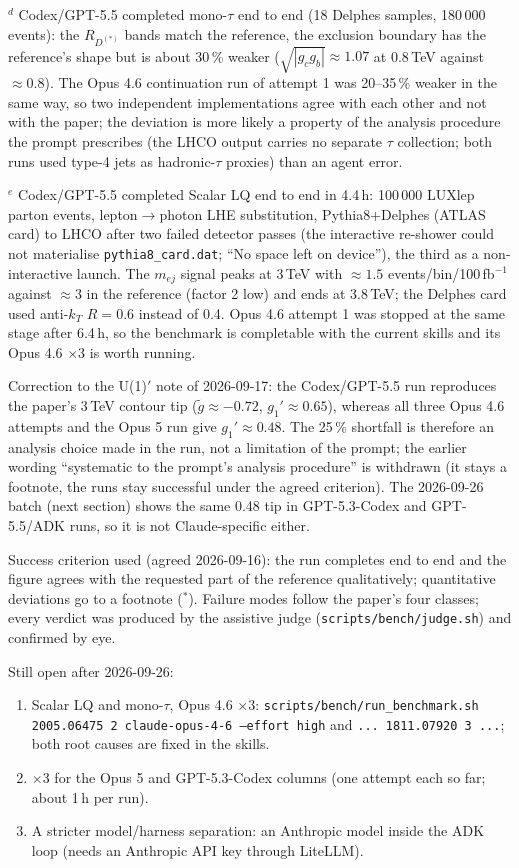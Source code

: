 \documentclass[11pt]{article}
\begin{document}
\noindent$^{d}$ Codex/GPT-5.5 completed mono-$\tau$ end to end (18 Delphes samples, 180\,000 events): the $R_{D^{(*)}}$ bands
match the reference, the exclusion boundary has the reference's shape but is about 30\,\% weaker ($\sqrt{|g_cg_b|}\approx1.07$
at 0.8\,TeV against $\approx0.8$). The Opus 4.6 continuation run of attempt 1 was 20--35\,\% weaker in the same way, so
two independent implementations agree with each other and not with the paper; the deviation is more likely a property of the
analysis procedure the prompt prescribes (the LHCO output carries no separate $\tau$ collection; both runs used type-4 jets
as hadronic-$\tau$ proxies) than an agent error.

\noindent$^{e}$ Codex/GPT-5.5 completed Scalar LQ end to end in 4.4\,h: 100\,000 LUXlep parton events, lepton$\to$photon LHE
substitution, Pythia8+Delphes (ATLAS card) to LHCO after two failed detector passes (the interactive re-shower could not
materialise \texttt{pythia8\_card.dat}; ``No space left on device''), the third as a non-interactive launch. The $m_{ej}$
signal peaks at 3\,TeV with $\approx1.5$ events/bin/100\,fb$^{-1}$ against $\approx3$ in the reference (factor 2 low) and ends
at 3.8\,TeV; the Delphes card used anti-$k_T$ $R=0.6$ instead of 0.4. Opus 4.6 attempt 1 was stopped at the same stage after
6.4\,h, so the benchmark is completable with the current skills and its Opus 4.6 $\times$3 is worth running.

Correction to the U(1)$'$ note of 2026-09-17: the Codex/GPT-5.5 run reproduces the paper's 3\,TeV contour tip
($\tilde g\approx-0.72$, $g_1'\approx0.65$), whereas all three Opus 4.6 attempts and the Opus 5 run give $g_1'\approx0.48$.
The 25\,\% shortfall is therefore an analysis choice made in the run, not a limitation of the prompt; the earlier
wording ``systematic to the prompt's analysis procedure'' is withdrawn (it stays a footnote, the runs stay successful under
the agreed criterion). The 2026-09-26 batch (next section) shows the same 0.48 tip in GPT-5.3-Codex and GPT-5.5/ADK runs,
so it is not Claude-specific either.

Success criterion used (agreed 2026-09-16): the run completes end to end and the figure agrees with the requested part of
the reference qualitatively; quantitative deviations go to a footnote ($^{*}$). Failure modes follow the paper's four
classes; every verdict was produced by the assistive judge (\texttt{scripts/bench/judge.sh}) and confirmed by eye.

Still open after 2026-09-26:
\begin{enumerate}
\item Scalar LQ and mono-$\tau$, Opus 4.6 $\times$3: \texttt{scripts/bench/run\_benchmark.sh 2005.06475 2 claude-opus-4-6
  --effort high} and \texttt{... 1811.07920 3 ...}; both root causes are fixed in the skills.
\item $\times$3 for the Opus 5 and GPT-5.3-Codex columns (one attempt each so far; about 1\,h per run).
\item A stricter model/harness separation: an Anthropic model inside the ADK loop (needs an Anthropic API key through LiteLLM).
\end{enumerate}
\end{document}
